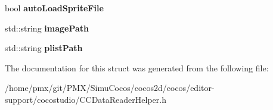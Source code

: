 \begin{DoxyCompactItemize}
\mbox{\label{structcocostudio_1_1DataReaderHelper_1_1__AsyncStruct_afccb6f1a9a8805a3c5346f397b6b8b3f}} 
bool {\bfseries auto\+Load\+Sprite\+File}
\item 
\mbox{\label{structcocostudio_1_1DataReaderHelper_1_1__AsyncStruct_ad55785418ebcf15d0948e22f53565802}} 
std\+::string {\bfseries image\+Path}
\item 
\mbox{\label{structcocostudio_1_1DataReaderHelper_1_1__AsyncStruct_a08892e5d5aa4d67c4485cd5fae58f4b9}} 
std\+::string {\bfseries plist\+Path}
\end{DoxyCompactItemize}


The documentation for this struct was generated from the following file\+:\begin{DoxyCompactItemize}
\item 
/home/pmx/git/\+P\+M\+X/\+Simu\+Cocos/cocos2d/cocos/editor-\/support/cocostudio/C\+C\+Data\+Reader\+Helper.\+h\end{DoxyCompactItemize}
